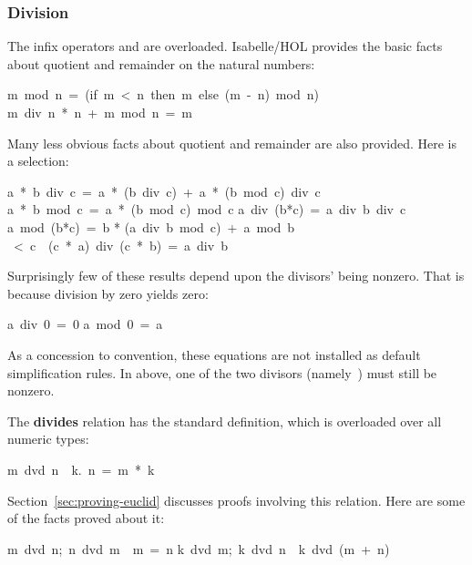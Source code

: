 \subsubsection{Division}
The infix operators  and  are overloaded.
Isabelle/HOL provides the basic facts about quotient and remainder
on the natural numbers:
\begin{isabelle}
m\ mod\ n\ =\ (if\ m\ <\ n\ then\ m\ else\ (m\ -\ n)\ mod\ n)
\isanewline
m\ div\ n\ *\ n\ +\ m\ mod\ n\ =\ m%
\end{isabelle}

Many less obvious facts about quotient and remainder are also provided. 
Here is a selection:
\begin{isabelle}
a\ *\ b\ div\ c\ =\ a\ *\ (b\ div\ c)\ +\ a\ *\ (b\ mod\ c)\ div\ c%
\isanewline
a\ *\ b\ mod\ c\ =\ a\ *\ (b\ mod\ c)\ mod\ c%
\isanewline
a\ div\ (b*c)\ =\ a\ div\ b\ div\ c%
\isanewline
a\ mod\ (b*c)\ =\ b * (a\ div\ b\ mod\ c)\ +\ a\ mod\ b%
\ <\ c\ \isasymLongrightarrow \ (c\ *\ a)\ div\ (c\ *\ b)\ =\ a\ div\ b%
\end{isabelle}

Surprisingly few of these results depend upon the
divisors' being nonzero.  That is because division by
zero yields zero:
\begin{isabelle}
a\ div\ 0\ =\ 0
\isanewline
a\ mod\ 0\ =\ a%
\end{isabelle}
As a concession to convention, these equations are not installed as default
simplification rules.  In  above, one of
the two divisors (namely~) must still be nonzero.

The \textbf{divides} relation has the standard definition, which
is overloaded over all numeric types: 
\begin{isabelle}
m\ dvd\ n\ \isasymequiv\ {\isasymexists}k.\ n\ =\ m\ *\ k
\end{isabelle}
%
Section~\ref{sec:proving-euclid} discusses proofs involving this
relation.  Here are some of the facts proved about it:
\begin{isabelle}
\isasymlbrakk m\ dvd\ n;\ n\ dvd\ m\isasymrbrakk \ \isasymLongrightarrow \ m\ =\ n%
\isanewline
\isasymlbrakk k\ dvd\ m;\ k\ dvd\ n\isasymrbrakk \ \isasymLongrightarrow \ k\ dvd\ (m\ +\ n)
\end{isabelle}

